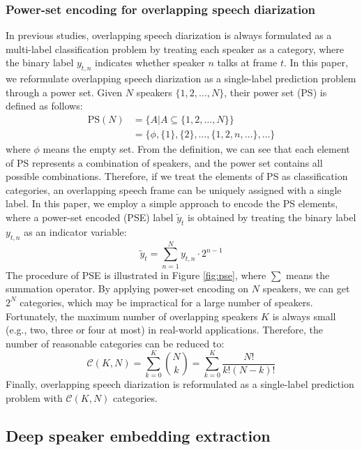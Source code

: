 \documentclass[a4paper]{article}
\begin{document}
\subsubsection{Power-set encoding for overlapping speech diarization}
In previous studies, overlapping speech diarization is always formulated as a multi-label classification problem by treating each speaker as a category, where the binary label $y_{t,n}$ indicates whether speaker $n$ talks at frame $t$.
In this paper, we reformulate overlapping speech diarization as a single-label prediction problem through a power set.
Given $N$ speakers $\{1,2,\dots,N\}$, their power set (PS) is defined as follows:
\begin{equation}
	\begin{split}
		\mathrm{PS}(N) &=\{A|A\subseteq \{1,2,\dots,N\}\} \\
		&=\{\phi,\{1\},\{2\},\dots,\{1,2,n,\dots\}, \dots \}         
	\end{split}
\end{equation}
where $\phi$ means the empty set. 
From the definition, we can see that each element of PS represents a combination of speakers, and the power set contains all possible combinations. 
Therefore, if we treat the elements of PS as classification categories, an overlapping speech frame can be uniquely assigned with a single label.
In this paper, we employ a simple approach to encode the PS elements, where a power-set encoded (PSE) label $\tilde{y}_t$ is obtained by treating the binary label $y_{t,n}$ as an indicator variable:
\begin{equation}
	\tilde{y}_t= \sum_{n=1}^{N}{y_{t,n}\cdot 2^{n-1}}
\end{equation}
The procedure of PSE is illustrated in Figure \ref{fig:pse}, where $\sum$ means the summation operator.
By applying power-set encoding on $N$ speakers, we can get $2^N$ categories, which may be impractical for a large number of speakers. 
Fortunately, the maximum number of overlapping speakers $K$ is always small (e.g., two, three or four at most) in real-world applications. Therefore, the number of reasonable categories can be reduced to:
\begin{equation}
	\mathcal{C}(K,N) = \sum_{k=0}^{K}{N \choose k} = \sum_{k=0}^{K}\frac{N!}{k!(N-k)!}
\end{equation}
Finally, overlapping speech diarization is reformulated as a single-label prediction problem with $\mathcal{C}(K,N)$ categories.


\subsection{Deep speaker embedding extraction}
\end{document}
